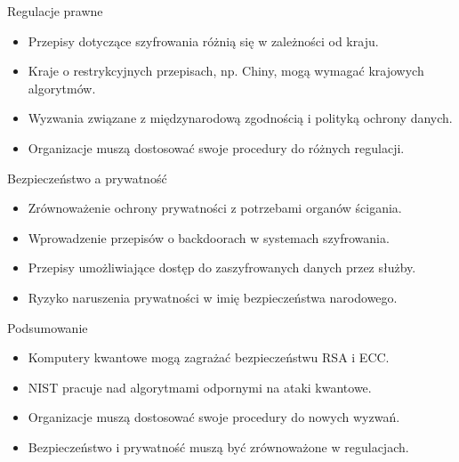\begin{frame}{Regulacje prawne}
    \begin{itemize}
            \item Przepisy dotyczące szyfrowania różnią się w zależności od kraju.
            \item Kraje o restrykcyjnych przepisach, np. Chiny, mogą wymagać krajowych algorytmów.
            \item Wyzwania związane z międzynarodową zgodnością i polityką ochrony danych.
            \item Organizacje muszą dostosować swoje procedury do różnych regulacji.
    \end{itemize}
\end{frame}
\begin{frame}{Bezpieczeństwo a prywatność}
    \begin{itemize}
        \item Zrównoważenie ochrony prywatności z potrzebami organów ścigania.
        \item Wprowadzenie przepisów o backdoorach w systemach szyfrowania.
        \item Przepisy umożliwiające dostęp do zaszyfrowanych danych przez służby.
        \item Ryzyko naruszenia prywatności w imię bezpieczeństwa narodowego.
    \end{itemize}
\end{frame}
\begin{frame}{Podsumowanie}
    \begin{itemize}
        \item Komputery kwantowe mogą zagrażać bezpieczeństwu RSA i ECC.
        \item NIST pracuje nad algorytmami odpornymi na ataki kwantowe.
        \item Organizacje muszą dostosować swoje procedury do nowych wyzwań.
        \item Bezpieczeństwo i prywatność muszą być zrównoważone w regulacjach.
    \end{itemize}
\end{frame}
